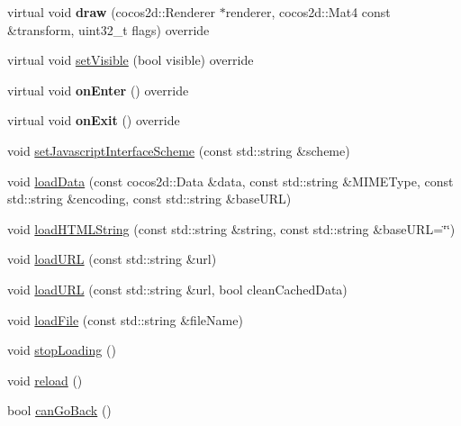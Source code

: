 \begin{DoxyCompactItemize}
virtual void {\bfseries draw} (cocos2d\+::\+Renderer $\ast$renderer, cocos2d\+::\+Mat4 const \&transform, uint32\+\_\+t flags) override
\item 
virtual void \hyperlink{classexperimental_1_1ui_1_1WebView_a10dcce8d4ec09f0efb49dd845131af5a}{set\+Visible} (bool visible) override
\item 
\mbox{\label{classexperimental_1_1ui_1_1WebView_a6fc71724153b3295c0e105c7b838e1aa}} 
virtual void {\bfseries on\+Enter} () override
\item 
\mbox{\label{classexperimental_1_1ui_1_1WebView_adc4e3fea947a49f47372cda9bf607c1d}} 
virtual void {\bfseries on\+Exit} () override
\item 
void \hyperlink{classexperimental_1_1ui_1_1WebView_a3beb4ee6d10fe0cc567483b65dabaa5b}{set\+Javascript\+Interface\+Scheme} (const std\+::string \&scheme)
\item 
void \hyperlink{classexperimental_1_1ui_1_1WebView_a80a8a6f40866b1db05ce9d866669fb2d}{load\+Data} (const cocos2d\+::\+Data \&data, const std\+::string \&M\+I\+M\+E\+Type, const std\+::string \&encoding, const std\+::string \&base\+U\+RL)
\item 
void \hyperlink{classexperimental_1_1ui_1_1WebView_aead3a24dfa6db7bb8175d3616a415c20}{load\+H\+T\+M\+L\+String} (const std\+::string \&string, const std\+::string \&base\+U\+RL=\char`\"{}\char`\"{})
\item 
void \hyperlink{classexperimental_1_1ui_1_1WebView_ac6824942bb8915c2b662ce185e9c82ee}{load\+U\+RL} (const std\+::string \&url)
\item 
void \hyperlink{classexperimental_1_1ui_1_1WebView_a86d715307de312c6a5dd5a49ba90aa4d}{load\+U\+RL} (const std\+::string \&url, bool clean\+Cached\+Data)
\item 
void \hyperlink{classexperimental_1_1ui_1_1WebView_ac8b1fdef3df527682cfb9b875856f990}{load\+File} (const std\+::string \&file\+Name)
\item 
void \hyperlink{classexperimental_1_1ui_1_1WebView_a75b2a3f82d7c6ed497577e6ae481b81a}{stop\+Loading} ()
\item 
void \hyperlink{classexperimental_1_1ui_1_1WebView_a2176ef4153df90beadf3d00d780f8526}{reload} ()
\item 
bool \hyperlink{classexperimental_1_1ui_1_1WebView_a4ecc93bca134d1f5d15ae1e46c292608}{can\+Go\+Back} ()
\item 

\end{DoxyCompactItemize}
